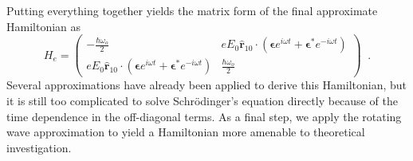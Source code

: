 Putting everything together yields the matrix form of the final approximate Hamiltonian as \cite{Kok2010}
$$
H_e = \begin{pmatrix}
-\frac{\hbar \omega_o}{2} & e E_0 \hat{\mathbf{r}}_{10}\cdot\left(\mathbf{\epsilon} e^{i\omega t} + \mathbf{\epsilon}^* e^{-i\omega t}\right)\\
e E_0 \hat{\mathbf{r}}_{10}\cdot\left(\mathbf{\epsilon} e^{i\omega t} + \mathbf{\epsilon}^* e^{-i\omega t}\right) & \frac{\hbar \omega_o}{2}
\end{pmatrix}\;\;.
$$
Several approximations have already been applied to derive this Hamiltonian, but it is still too complicated to solve Schr\"{o}dinger's equation directly because of the time dependence in the off-diagonal terms.  As a final step, we apply the rotating wave approximation to yield a Hamiltonian more amenable to theoretical investigation.

